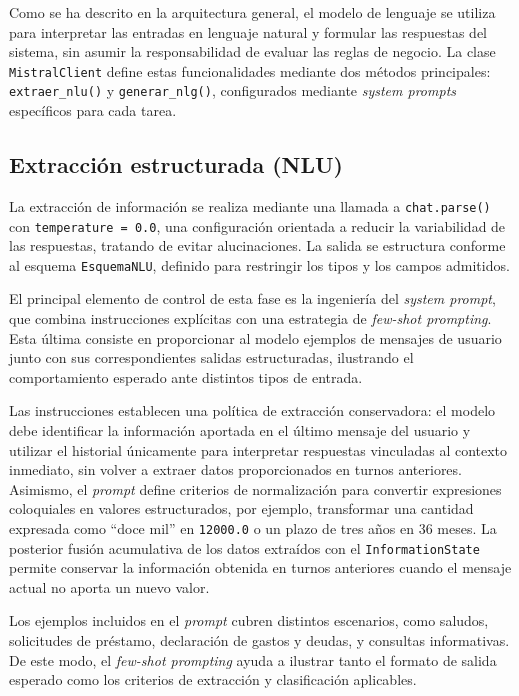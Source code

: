 \documentclass[12pt,a4paper]{report}
\begin{document}
Como se ha descrito en la arquitectura general, el modelo de lenguaje se utiliza para interpretar las entradas en lenguaje natural y formular las respuestas del sistema, sin asumir la responsabilidad de evaluar las reglas de negocio. La clase \texttt{MistralClient} define estas funcionalidades mediante dos métodos principales: \texttt{extraer\_nlu()} y \texttt{generar\_nlg()}, configurados mediante \textit{system prompts} específicos para cada tarea.

\subsection{Extracción estructurada (NLU)}

La extracción de información se realiza mediante una llamada a \texttt{chat.parse()} con \texttt{temperature = 0.0}, una configuración orientada a reducir la variabilidad de las respuestas, tratando de evitar alucinaciones. La salida se estructura conforme al esquema \texttt{EsquemaNLU}, definido para restringir los tipos y los campos admitidos.

El principal elemento de control de esta fase es la ingeniería del \textit{system prompt}, que combina instrucciones explícitas con una estrategia de \textit{few-shot prompting}. Esta última consiste en proporcionar al modelo ejemplos de mensajes de usuario junto con sus correspondientes salidas estructuradas, ilustrando el comportamiento esperado ante distintos tipos de entrada.

Las instrucciones establecen una política de extracción conservadora: el modelo debe identificar la información aportada en el último mensaje del usuario y utilizar el historial únicamente para interpretar respuestas vinculadas al contexto inmediato, sin volver a extraer datos proporcionados en turnos anteriores. Asimismo, el \textit{prompt} define criterios de normalización para convertir expresiones coloquiales en valores estructurados, por ejemplo, transformar una cantidad expresada como ``doce mil'' en \texttt{12000.0} o un plazo de tres años en 36 meses. La posterior fusión acumulativa de los datos extraídos con el \texttt{InformationState} permite conservar la información obtenida en turnos anteriores cuando el mensaje actual no aporta un nuevo valor.

Los ejemplos incluidos en el \textit{prompt} cubren distintos escenarios, como saludos, solicitudes de préstamo, declaración de gastos y deudas, y consultas informativas. De este modo, el \textit{few-shot prompting} ayuda a ilustrar tanto el formato de salida esperado como los criterios de extracción y clasificación aplicables.
\end{document}
